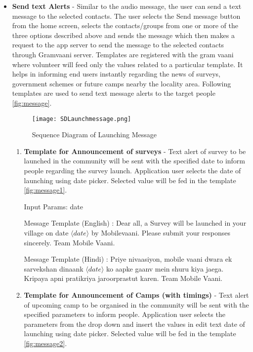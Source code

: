 \begin{itemize}
\item\textbf {Send text Alerts} - Similar to the audio message, the user can
send a text message to the selected contacts. The user selects the Send
message button from the home screen, selects the contacts/groups from
one or more of the three options described above and sends the message
which then makes a request to the app server to send the message to
the selected contacts through Gramvaani server. Templates are registered with the gram vaani where volunteer will feed only the values related to a particular template. It helps in informing end users instantly regarding the news of surveys, government schemes or future camps nearby the locality area. Following templates are used to send text message alerts to the target people \ref{fig:message}.

\begin{figure}[H]
    \centering
	\texttt{[image: SDLaunchmessage.png]}
    \caption{ Sequence Diagram of Launching Message}
    \label{fig:Sequence Diagram of Launching Message}
\end{figure}

\begin{enumerate}
\item \textbf {Template for Announcement of surveys} - Text alert of survey to be launched in the community will be sent with the specified date to inform people regarding the survey launch. Application user selects the date of launching using date picker. Selected value will be fed in the template \ref{fig:message1}.

Input Params: date 

Message Template (English) : Dear all, a Survey ​will be launched in your village on date $\langle date \rangle$  by Mobilevaani. Please submit your responses sincerely. ​Team Mobile Vaani.
 
Message Template (Hindi) : Priye nivaasiyon​, mobile vaani dwara ​ek sarvekshan dinaank $\langle date\rangle$  ko ​aapke​ gaanv mein shuru kiya jaega. Kripaya apni pratikriya ​jaroor​  prastut karen. Team Mobile Vaani.

\item \textbf {Template for Announcement of Camps (with timings)} - Text alert of upcoming camp to be organised in the community will be sent with the specified parameters to inform people. Application user selects the parameters from the drop down and insert the values in edit text date of launching using date picker. Selected value will be fed in the template \ref{fig:message2}.


\end{enumerate}
\end{itemize}
